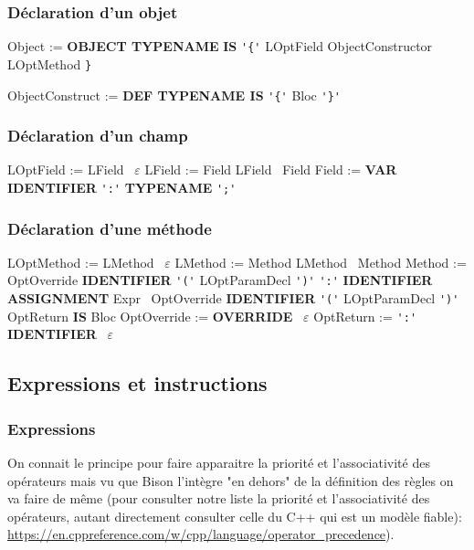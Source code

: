 \documentclass[12pt,a4paper]{article}
\begin{document}
\subsubsection{Déclaration d'un objet}

{\sffamily
Object := \textbf{OBJECT TYPENAME} \textbf{IS} \verb|'{'| LOptField ObjectConstructor LOptMethod \verb|}|

ObjectConstruct := \textbf{DEF TYPENAME IS} \verb|'{'| Bloc \verb|'}'|
}

\subsubsection{Déclaration d'un champ}

{\sffamily
LOptField := LField \textbar \ $\varepsilon$ \newline
LField := Field LField \textbar \ Field \newline
Field := \textbf{VAR IDENTIFIER} \verb|':'| \textbf{TYPENAME} \verb|';'|
}

\subsubsection{Déclaration d'une méthode}

{\sffamily\small
LOptMethod := LMethod \textbar \ $\varepsilon$ \newline
LMethod := Method LMethod \textbar \ Method \newline
Method := OptOverride \textbf{IDENTIFIER} \verb|'('| LOptParamDecl \verb|')'| \verb|':'| \textbf{IDENTIFIER ASSIGNMENT} Expr \newline
\hspace*{1em} \textbar \ OptOverride \textbf{IDENTIFIER} \verb|'('| LOptParamDecl \verb|')'| OptReturn \textbf{IS} Bloc \newline
OptOverride := \textbf{OVERRIDE} \textbar \ $\varepsilon$ \newline
OptReturn := \verb|':'| \textbf{IDENTIFIER} \textbar \ $\varepsilon$
}

\subsection{Expressions et instructions}

\subsubsection{Expressions}

On connait le principe pour faire apparaitre la priorité et l'associativité des opérateurs mais vu que Bison l'intègre "en dehors" de la définition des règles on va faire de même (pour consulter notre liste la priorité et l'associativité des opérateurs, autant directement consulter celle du C++ qui est un modèle fiable): \url{https://en.cppreference.com/w/cpp/language/operator_precedence}).
\end{document}
